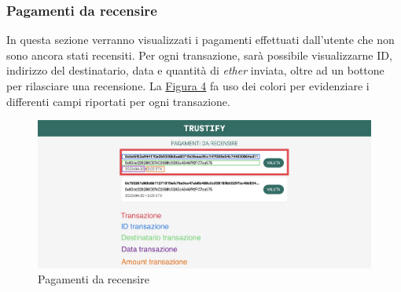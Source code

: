 \subsubsection{Pagamenti da recensire}
In questa sezione verranno visualizzati i pagamenti effettuati dall'utente che non sono ancora stati recensiti. Per ogni transazione, sarà possibile visualizzarne ID, indirizzo del destinatario, data e quantità di \textit{ether} inviata, oltre ad un bottone per rilasciare una recensione. La \hyperref[fig:pagamenti]{Figura 4} fa uso dei colori per evidenziare i differenti campi riportati per ogni transazione.
\begin{figure}[H]
    \includegraphics[width=\linewidth]{src/img/pagamenti.jpeg}
    \caption[Pagamenti da recensire]{Pagamenti da recensire\protect\footnotemark}\label{fig:pagamenti}
\end{figure}

\pagebreak

